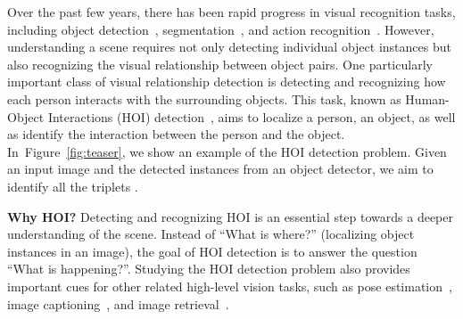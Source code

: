 \documentclass{bmvc2k}
\newcommand{\figref}[1]{Figure~\ref{fig:#1}}
\begin{document}
Over the past few years, there has been rapid progress in visual recognition tasks, including object detection~\cite{Dai-NIPS-RFCN,Ross-CVPR-FastRCNN,Lin-CVPR-Pyramid,Ren-NIPS-FasterRCNN}, segmentation~\cite{Chen-TPAMI-DeepLab,Ross-CVPR-Hierarchies,He-ICCV-MaskRCNN,Long-CVPR-FCN}, and action recognition~\cite{Cheron-ICCV-PCNN,Girdhar-NIPS-AttentionalPooling,Gkioxari-ICCV-R*CNN,Maji-CVPR-Action,Yao-CVPR-Combining}.
However, understanding a scene requires not only detecting individual object instances but also recognizing the visual relationship between object pairs.
One particularly important class of visual relationship detection is detecting and recognizing how each person interacts with the surrounding objects.
This task, known as Human-Object Interactions (HOI) detection~\cite{Chao-WACV-HOI,Gkioxari-CVPR-InteractNet,Gupta-TPAMI-Observing,Gupta-SemanticRoleLabeling}, aims to localize a person, an object, as well as identify the interaction between the person and the object.
In~\figref{teaser}, we show an example of the HOI detection problem.
Given an input image and the detected instances from an object detector, we aim to identify all the triplets   .


\textbf{Why HOI?} Detecting and recognizing HOI is an essential step towards a deeper understanding of the scene.
Instead of ``What is where?'' (\ie localizing object instances in an image), the goal of HOI detection is to answer the question ``What is happening?''.
Studying the HOI detection problem also provides important cues for other related high-level vision tasks, such as pose estimation~\cite{Cao-CVPR-OpenPese,Yao-BMVC-Pose}, image captioning~\cite{Li-CVPR-Scene,Xu-CVPR-SceneGraph}, and image retrieval~\cite{Johnson-CVPR-Retrieval}.
\end{document}
